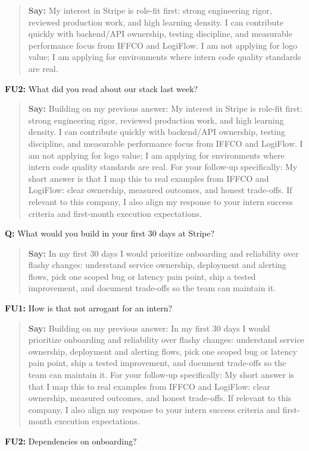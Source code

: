 \documentclass[9pt,a4paper]{article}
\begin{document}
\begin{quote}\small\textbf{Say:} My interest in Stripe is role-fit first: strong engineering rigor, reviewed production work, and high learning density. I can contribute quickly with backend/API ownership, testing discipline, and measurable performance focus from IFFCO and LogiFlow. I am not applying for logo value; I am applying for environments where intern code quality standards are real.\end{quote}
\vspace{2mm}
\textbf{FU2:} What did you read about our stack last week?

\begin{quote}\small\textbf{Say:} Building on my previous answer: My interest in Stripe is role-fit first: strong engineering rigor, reviewed production work, and high learning density. I can contribute quickly with backend/API ownership, testing discipline, and measurable performance focus from IFFCO and LogiFlow. I am not applying for logo value; I am applying for environments where intern code quality standards are real. For your follow-up specifically: My short answer is that I map this to real examples from IFFCO and LogiFlow: clear ownership, measured outcomes, and honest trade-offs. If relevant to this company, I also align my response to your intern success criteria and first-month execution expectations.\end{quote}
\vspace{2mm}
\textbf{Q:} What would you build in your first 30 days at Stripe?

\begin{quote}\small\textbf{Say:} In my first 30 days I would prioritize onboarding and reliability over flashy changes: understand service ownership, deployment and alerting flows, pick one scoped bug or latency pain point, ship a tested improvement, and document trade-offs so the team can maintain it.\end{quote}
\vspace{2mm}
\textbf{FU1:} How is that not arrogant for an intern?

\begin{quote}\small\textbf{Say:} Building on my previous answer: In my first 30 days I would prioritize onboarding and reliability over flashy changes: understand service ownership, deployment and alerting flows, pick one scoped bug or latency pain point, ship a tested improvement, and document trade-offs so the team can maintain it. For your follow-up specifically: My short answer is that I map this to real examples from IFFCO and LogiFlow: clear ownership, measured outcomes, and honest trade-offs. If relevant to this company, I also align my response to your intern success criteria and first-month execution expectations.\end{quote}
\vspace{2mm}
\textbf{FU2:} Dependencies on onboarding?
\end{document}
